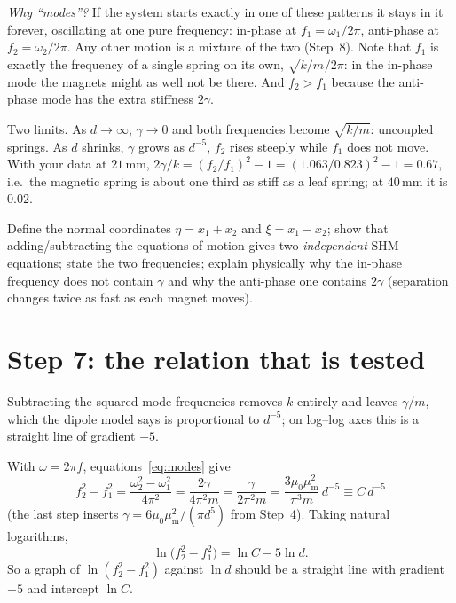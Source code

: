 \documentclass[11pt,a4paper]{article}
\newcommand{\muz}{\mu_0}
\newcommand{\mum}{\mu_{\mathrm m}}
\newcommand{\un}[1]{\,\mathrm{#1}}
\begin{document}
\emph{Why ``modes''?} If the system starts exactly in one of these patterns it stays in it forever, oscillating at one pure frequency: in-phase at $f_1=\omega_1/2\pi$, anti-phase at $f_2=\omega_2/2\pi$. Any other motion is a mixture of the two (Step~8). Note that $f_1$ is exactly the frequency of a single spring on its own, $\sqrt{k/m}/2\pi$: in the in-phase mode the magnets might as well not be there. And $f_2>f_1$ because the anti-phase mode has the extra stiffness $2\gamma$.

\begin{selfcheck}
Two limits. As $d\to\infty$, $\gamma\to0$ and both frequencies become $\sqrt{k/m}$: uncoupled springs. As $d$ shrinks, $\gamma$ grows as $d^{-5}$, $f_2$ rises steeply while $f_1$ does not move. With your data at $21\un{mm}$, $2\gamma/k=(f_2/f_1)^2-1=(1.063/0.823)^2-1=0.67$, i.e.\ the magnetic spring is about one third as stiff as a leaf spring; at $40\un{mm}$ it is $0.02$.
\end{selfcheck}

\begin{ownwords}
Define the normal coordinates $\eta=x_1+x_2$ and $\xi=x_1-x_2$; show that adding/subtracting the equations of motion gives two \emph{independent} SHM equations; state the two frequencies; explain physically why the in-phase frequency does not contain $\gamma$ and why the anti-phase one contains $2\gamma$ (separation changes twice as fast as each magnet moves).
\end{ownwords}

\bigskip
\section{Step 7: the relation that is tested}

\begin{idea}
Subtracting the squared mode frequencies removes $k$ entirely and leaves $\gamma/m$, which the dipole model says is proportional to $d^{-5}$; on log--log axes this is a straight line of gradient $-5$.
\end{idea}

With $\omega=2\pi f$, equations~\eqref{eq:modes} give
\begin{equation}
\boxed{\;f_2^2-f_1^2=\frac{\omega_2^2-\omega_1^2}{4\pi^2}=\frac{2\gamma}{4\pi^2m}=\frac{\gamma}{2\pi^2m}
=\frac{3\muz\mum^2}{\pi^3m}\,d^{-5}\equiv C\,d^{-5}\;}
\label{eq:main}
\end{equation}
(the last step inserts $\gamma=6\muz\mum^2/(\pi d^5)$ from Step~4). Taking natural logarithms,
\begin{equation}
\ln\big(f_2^2-f_1^2\big)=\ln C-5\ln d .
\end{equation}
So a graph of $\ln(f_2^2-f_1^2)$ against $\ln d$ should be a straight line with gradient $-5$ and intercept $\ln C$.
\end{document}
